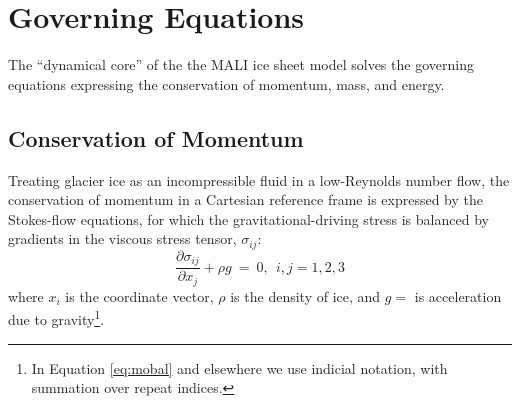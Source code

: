 \chapter{Governing Equations}
\label{chap:landice-mobal}


The ``dynamical core'' of the the MALI ice sheet model solves the governing equations expressing the conservation of momentum, mass, and energy.   

\section{Conservation of Momentum}
\label{sec:consmom}

Treating glacier ice as an incompressible fluid in a low-Reynolds number flow,
the conservation of momentum in a Cartesian reference frame is expressed by the Stokes-flow equations, for which the gravitational-driving stress is balanced by gradients in the viscous stress tensor, $\sigma_{ij}$:
\begin{equation}
\frac{\partial \sigma_{ij}}{\partial x_{j}} + \rho g ~=~0, ~~i,j=1,2,3
\label{eq:mobal}
\end{equation}
\noindent
where $x_i$ is the coordinate vector, $\rho$ is the density of ice, and $g=$ is acceleration due to gravity\footnote{In Equation \ref{eq:mobal} and elsewhere we use indicial notation, with summation over repeat indices.}.

